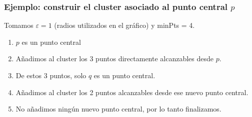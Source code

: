 \documentclass[aspectratio=169,12pt]{beamer}
\begin{document}
\begin{frame}
\frametitle{Ejemplo: construir el cluster asociado al punto central $p$}

Tomamos $\varepsilon = 1$ (radios utilizados en el gráfico) y minPts = 4.

\begin{enumerate}
\item $p$ es un punto central
\item {} {Añadimos al cluster los 3 puntos directamente alcanzables desde $p$.}
\item {} {De estos 3 puntos, solo $q$ es un punto central.}
\item {} {Añadimos al cluster los 2 puntos alcanzables desde ese nuevo punto central.}
\item {} {No añadimos ningún nuevo punto central, por lo tanto finalizamos.}
\end{enumerate}


\end{frame}
\end{document}
